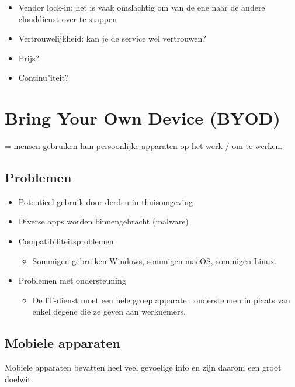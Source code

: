\documentclass{article}
\begin{document}
\begin{itemize}
    \item Vendor lock-in: het is vaak omslachtig om van de ene naar de andere clouddienst over te stappen
    \item Vertrouwelijkheid: kan je de service wel vertrouwen?
    \item Prijs?
    \item Continu"iteit?
\end{itemize}

\section{Bring Your Own Device (BYOD)}

= mensen gebruiken hun persoonlijke apparaten op het werk / om te werken.

\subsection{Problemen}

\begin{itemize}
    \item Potentieel gebruik door derden in thuisomgeving
    \item Diverse apps worden binnengebracht (malware)
    \item Compatibiliteitsproblemen
    \begin{itemize}
        \item Sommigen gebruiken Windows, sommigen macOS, sommigen Linux.
    \end{itemize}
    \item Problemen met ondersteuning
    \begin{itemize}
        \item De IT-dienst moet een hele groep apparaten ondersteunen in plaats van enkel degene die ze geven aan werknemers.
    \end{itemize}
\end{itemize}

\subsection{Mobiele apparaten}

Mobiele apparaten bevatten heel veel gevoelige info en zijn daarom een groot doelwit:
\end{document}
